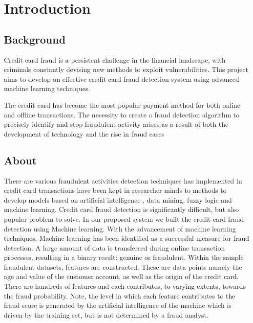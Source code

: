 \let\cleardoublepage\clearpage
\chapter{Introduction} %

\label{Chapter1} %


\newcommand{\keyword}[1]{\textbf{#1}}
\newcommand{\tabhead}[1]{\textbf{#1}}
\newcommand{\code}[1]{\texttt{#1}}
\newcommand{\file}[1]{\texttt{\bfseries#1}}
\newcommand{\option}[1]{\texttt{\itshape#1}}

\section{Background}
Credit card fraud is a persistent challenge in the financial landscape, with criminals constantly devising new methods to exploit vulnerabilities. This project aims to develop an effective credit card fraud detection system using advanced machine learning techniques.\medskip

The credit card has become the most popular payment method for both online and offline transactions. The necessity to create a fraud detection algorithm to precisely identify and stop fraudulent activity arises as a result of both the development of technology and the rise in fraud cases

\section{About}
There are various fraudulent activities detection techniques
has implemented in credit card transactions have been kept
in researcher minds to methods to develop models based on
artificial intelligence , data mining, fuzzy logic and machine
learning. Credit card fraud detection is significantly difficult,
but also popular problem to solve. In our proposed system
we built the credit card fraud detection using Machine
learning. With the advancement of machine learning
techniques. Machine learning has been identified as a
successful measure for fraud detection. A large amount of
data is transferred during online transaction processes,
resulting in a binary result: genuine or fraudulent. Within the
sample fraudulent datasets, features are constructed. These
are data points namely the age and value of the customer
account, as well as the origin of the credit card. There are
hundreds of features and each contributes, to varying
extents, towards the fraud probability. Note, the level in
which each feature contributes to the fraud score is
generated by the artificial intelligence of the machine which
is driven by the training set, but is not determined by a fraud analyst. \medskip

